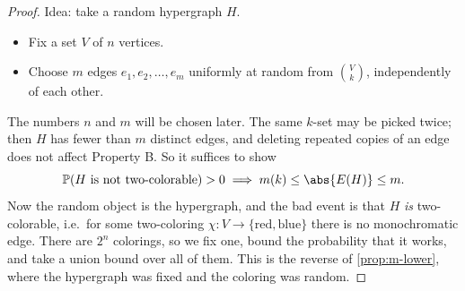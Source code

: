 \begin{proof}
    Idea: take a random hypergraph \(H\).
    \begin{itemize}
        \item Fix a set \(V\) of \(n\) vertices.
        \item Choose \(m\) edges \(e_1, e_2, \ldots, e_m\) uniformly at random from \(\binom{V}{k}\), independently of each other.
    \end{itemize}
    The numbers \(n\) and \(m\) will be chosen later. The same \(k\)-set may be picked twice; then \(H\) has fewer than \(m\) distinct edges, and deleting repeated copies of an edge does not affect Property B. So it suffices to show
    \[
        \mathbb{P}(H \text{ is not two-colorable}) > 0 \implies m(k) \le \abs{E(H)} \le m.
    \]
    Now the random object is the hypergraph, and the bad event is that \(H\) \emph{is} two-colorable, i.e.\ for some two-coloring \(\chi \colon V \to \{\text{red}, \text{blue}\}\) there is no monochromatic edge. There are \(2^n\) colorings, so we fix one, bound the probability that it works, and take a union bound over all of them. This is the reverse of \autoref{prop:m-lower}, where the hypergraph was fixed and the coloring was random.


\end{proof}
